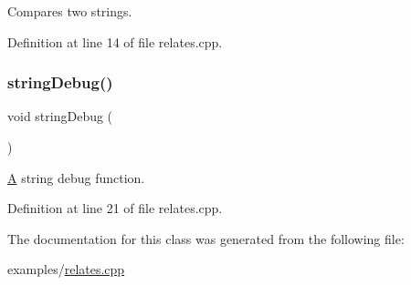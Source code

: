 Compares two strings. 

Definition at line 14 of file relates.\+cpp.


\begin{DoxyCode}{0}

\end{DoxyCode}
\mbox{\label{class_string_a5c07384b505d25ae6f61fc7abf0b0e61}} 
\subsubsection{\texorpdfstring{stringDebug()}{stringDebug()}}
{\footnotesize\ttfamily void string\+Debug (\begin{DoxyParamCaption}{ }\end{DoxyParamCaption})\hspace{0.3cm}{\ttfamily [related]}}

\mbox{\hyperlink{class_a}{A}} string debug function. 

Definition at line 21 of file relates.\+cpp.


\begin{DoxyCode}{0}

\end{DoxyCode}


The documentation for this class was generated from the following file\+:\begin{DoxyCompactItemize}
\item 
examples/\mbox{\hyperlink{relates_8cpp}{relates.\+cpp}}\end{DoxyCompactItemize}
